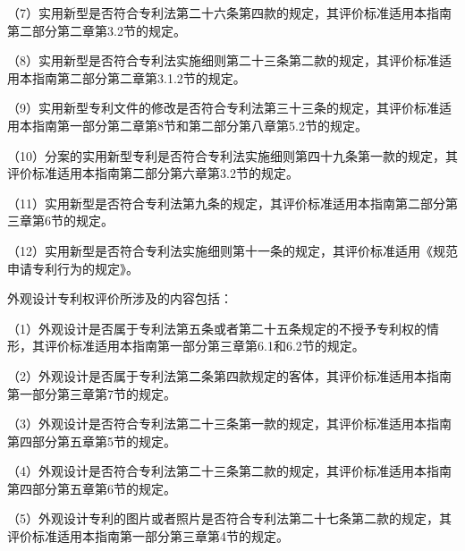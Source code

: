 {\setlength{\parindent}{17.1bp}（7）实用新型是否符合专利法第二十六条第四款的规定，其评价标准适用本指南第二部分第二章第3.2节的规定。\par}

{\setlength{\parindent}{17.1bp}（8）实用新型是否符合专利法实施细则第二十三条第二款的规定，其评价标准适用本指南第二部分第二章第3.1.2节的规定。\par}

{\setlength{\parindent}{17.1bp}（9）实用新型专利文件的修改是否符合专利法第三十三条的规定，其评价标准适用本指南第一部分第二章第8节和第二部分第八章第5.2节的规定。\par}

{\setlength{\parindent}{17.1bp}（10）分案的实用新型专利是否符合专利法实施细则第四十九条第一款的规定，其评价标准适用本指南第二部分第六章第3.2节的规定。\par}

{\setlength{\parindent}{17.1bp}（11）实用新型是否符合专利法第九条的规定，其评价标准适用本指南第二部分第三章第6节的规定。\par}

{\setlength{\parindent}{17.1bp}（12）实用新型是否符合专利法实施细则第十一条的规定，其评价标准适用《规范申请专利行为的规定》。\par}

外观设计专利权评价所涉及的内容包括：

{\setlength{\parindent}{17.1bp}（1）外观设计是否属于专利法第五条或者第二十五条规定的不授予专利权的情形，其评价标准适用本指南第一部分第三章第6.1和6.2节的规定。\par}

{\setlength{\parindent}{17.1bp}（2）外观设计是否属于专利法第二条第四款规定的客体，其评价标准适用本指南第一部分第三章第7节的规定。\par}

{\setlength{\parindent}{17.1bp}（3）外观设计是否符合专利法第二十三条第一款的规定，其评价标准适用本指南第四部分第五章第5节的规定。\par}

{\setlength{\parindent}{17.1bp}（4）外观设计是否符合专利法第二十三条第二款的规定，其评价标准适用本指南第四部分第五章第6节的规定。\par}

{\setlength{\parindent}{17.1bp}（5）外观设计专利的图片或者照片是否符合专利法第二十七条第二款的规定，其评价标准适用本指南第一部分第三章第4节的规定。\par}

